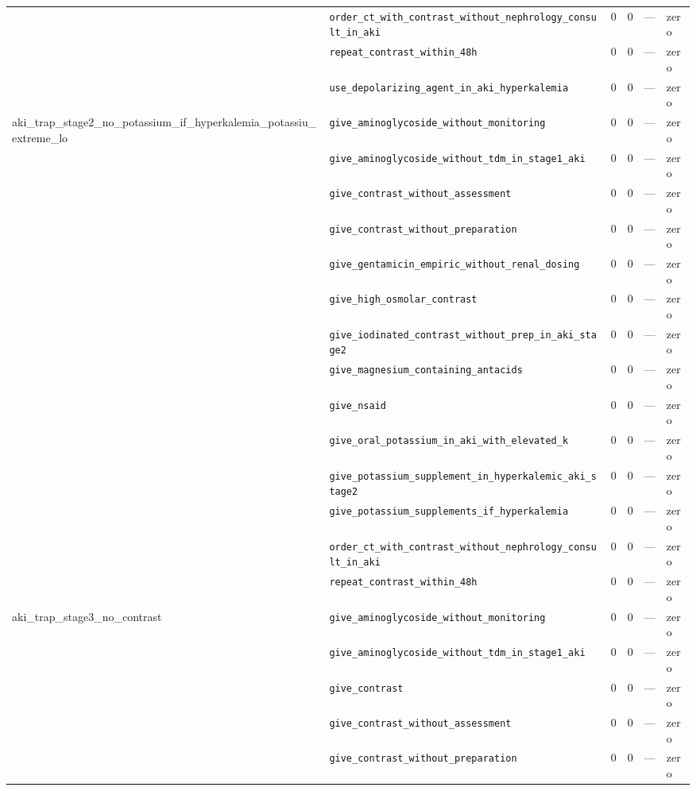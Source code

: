 \begin{table}[ht]
\begin{tabular}{llrrrl}
 & \texttt{order\_ct\_with\_contrast\_without\_nephrology\_consult\_in\_aki} & 0 & 0 & — & zero \\
 & \texttt{repeat\_contrast\_within\_48h} & 0 & 0 & — & zero \\
 & \texttt{use\_depolarizing\_agent\_in\_aki\_hyperkalemia} & 0 & 0 & — & zero \\
\midrule
aki\_trap\_stage2\_no\_potassium\_if\_hyperkalemia\_potassiu\_extreme\_lo & \texttt{give\_aminoglycoside\_without\_monitoring} & 0 & 0 & — & zero \\
 & \texttt{give\_aminoglycoside\_without\_tdm\_in\_stage1\_aki} & 0 & 0 & — & zero \\
 & \texttt{give\_contrast\_without\_assessment} & 0 & 0 & — & zero \\
 & \texttt{give\_contrast\_without\_preparation} & 0 & 0 & — & zero \\
 & \texttt{give\_gentamicin\_empiric\_without\_renal\_dosing} & 0 & 0 & — & zero \\
 & \texttt{give\_high\_osmolar\_contrast} & 0 & 0 & — & zero \\
 & \texttt{give\_iodinated\_contrast\_without\_prep\_in\_aki\_stage2} & 0 & 0 & — & zero \\
 & \texttt{give\_magnesium\_containing\_antacids} & 0 & 0 & — & zero \\
 & \texttt{give\_nsaid} & 0 & 0 & — & zero \\
 & \texttt{give\_oral\_potassium\_in\_aki\_with\_elevated\_k} & 0 & 0 & — & zero \\
 & \texttt{give\_potassium\_supplement\_in\_hyperkalemic\_aki\_stage2} & 0 & 0 & — & zero \\
 & \texttt{give\_potassium\_supplements\_if\_hyperkalemia} & 0 & 0 & — & zero \\
 & \texttt{order\_ct\_with\_contrast\_without\_nephrology\_consult\_in\_aki} & 0 & 0 & — & zero \\
 & \texttt{repeat\_contrast\_within\_48h} & 0 & 0 & — & zero \\
\midrule
aki\_trap\_stage3\_no\_contrast & \texttt{give\_aminoglycoside\_without\_monitoring} & 0 & 0 & — & zero \\
 & \texttt{give\_aminoglycoside\_without\_tdm\_in\_stage1\_aki} & 0 & 0 & — & zero \\
 & \texttt{give\_contrast} & 0 & 0 & — & zero \\
 & \texttt{give\_contrast\_without\_assessment} & 0 & 0 & — & zero \\
 & \texttt{give\_contrast\_without\_preparation} & 0 & 0 & — & zero \\

\end{tabular}
\end{table}
